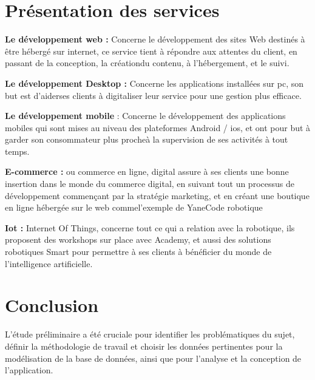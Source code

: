 \section{ Présentation des services }
\medskip

\textbf{Le développement web :} 
Concerne le développement des sites Web destinés à être hébergé sur internet, ce service tient à répondre aux attentes du client, en passant de la conception, la créationdu contenu, à l’hébergement, et le suivi.\\
\medskip

\textbf{Le développement Desktop :}
 Concerne les applications installées sur pc, son but est d’aiderses clients à digitaliser leur service pour une gestion plus efficace.\\
 \medskip

\textbf{Le développement mobile }
: Concerne le développement des applications mobiles qui
sont mises au niveau des plateformes Android / ios, et ont pour but à garder son consommateur plus procheà la supervision de ses activités à tout temps.\\
\medskip

\textbf{E-commerce :}
 ou commerce en ligne,  digital assure à ses clients une bonne insertion dans le monde du commerce digital, en suivant tout un processus de développement commençant par la stratégie marketing, et en créant une boutique en ligne hébergée sur le web commel’exemple de YaneCode robotique\\
 \medskip

\textbf{Iot :}
Internet Of Things, concerne tout ce qui a relation avec la robotique, ils
proposent des workshops sur place avec  Academy, et aussi des solutions
robotiques Smart pour permettre à ses clients à bénéficier du monde de l’intelligence artificielle.\\
\medskip

\section{ Conclusion}
L'étude préliminaire a été cruciale pour identifier les problématiques du sujet, définir la méthodologie de travail et choisir les données pertinentes pour la modélisation de la base de données, ainsi que pour l'analyse et la conception de l'application.

